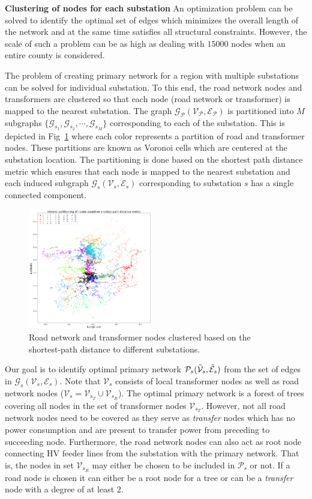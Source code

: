 \documentclass[sigconf]{acmart}
\begin{document}
\noindent\textbf{Clustering of nodes for each substation}
An optimization problem can be solved to identify the optimal set of edges which minimizes the overall length of the network and at the same time satisfies all structural constraints. However, the scale of such a problem can be as high as dealing with $15000$ nodes when an entire county is considered. 

The problem of creating primary network for a region with multiple substations can be solved for individual substation. To this end, the road network nodes and transformers are clustered so that each node (road network or transformer) is mapped to the nearest substation. The graph $\mathcal{G_P}(\mathcal{V_P},\mathcal{E_P})$ is partitioned into $M$ subgraphs $\{\mathcal{G}_{s_1},\mathcal{G}_{s_2},\cdots,\mathcal{G}_{s_M}\}$ corresponding to each of the substation. This is depicted in Fig~\ref{fig:voronoi} where each color represents a partition of road and transformer nodes. These partitions are known as Voronoi cells which are centered at the substation location. The partitioning is done based on the shortest path distance metric which ensures that each node is mapped to the nearest substation and each induced subgraph $\mathcal{G}_{s}(\mathcal{V}_s,\mathcal{E}_s)$ corresponding to substation $s$ has a single connected component.
\begin{figure}
	\centering
	\includegraphics[width=0.48\textwidth]{figs/voronoi.png}
	\caption{Road network and transformer nodes clustered based on the shortest-path distance to different substations.}
	\label{fig:voronoi}
\end{figure}

Our goal is to identify optimal primary network $\mathcal{P}_s(\Tilde{\mathcal{V}}_s,\Tilde{\mathcal{E}}_s)$ from the set of edges in $\mathcal{G}_{s}(\mathcal{V}_s,\mathcal{E}_s)$. Note that $\mathcal{V}_s$ consists of local transformer nodes as well as road network nodes ($\mathcal{V}_s=\mathcal{V}_{s_T}\cup\mathcal{V}_{s_R}$). The optimal primary network is a forest of trees covering all nodes in the set of transformer nodes $\mathcal{V}_{s_T}$. However, not all road network nodes need to be covered as they serve as \emph{transfer} nodes which has no power consumption and are present to transfer power from preceding to succeeding node. Furthermore, the road network nodes can also act as root node connecting HV feeder lines from the substation with the primary network. That is, the nodes in set $\mathcal{V}_{s_R}$ may either be chosen to be included in $\mathcal{P}_s$ or not. If a road node is chosen it can either be a root node for a tree or can be a \emph{transfer} node with a degree of at least $2$.
\end{document}
